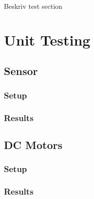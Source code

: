 Beskriv test section

\section{Unit Testing}

\subsection{Sensor}



\subsubsection{Setup}


\subsubsection{Results}


\subsection{DC Motors}



\subsubsection{Setup}

\subsubsection{Results}

